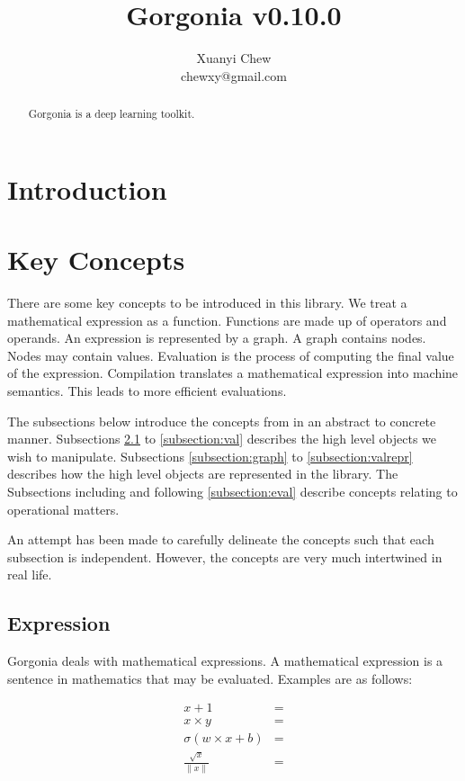 \documentclass{article}
\begin{document}
\title{Gorgonia v0.10.0}
\author{Xuanyi Chew \\
  \mbox{}
  chewxy@gmail.com
}
\maketitle

\begin{abstract}
  Gorgonia is a deep learning toolkit.
\end{abstract}

\section{Introduction}

\section{Key Concepts}

There are some key concepts to be introduced in this library. We treat a mathematical expression as a function. Functions are made up of operators and operands. An expression is represented by a graph. A graph contains nodes. Nodes may contain values. Evaluation is the process of computing the final value of the expression. Compilation translates a mathematical expression into machine semantics. This leads to more efficient evaluations.

The subsections below introduce the concepts from in an abstract to concrete manner. Subsections \ref{subsection:expr} to \ref{subsection:val} describes the high level objects we wish to manipulate. Subsections \ref{subsection:graph} to \ref{subsection:valrepr} describes how the high level objects are represented in the library. The Subsections including and following \ref{subsection:eval} describe concepts relating to operational matters.

An attempt has been made to carefully delineate the concepts such that each subsection is independent. However, the concepts are very much intertwined in real life.

\subsection{Expression} \label{subsection:expr}

Gorgonia deals with mathematical expressions. A mathematical expression is a sentence in mathematics that may be evaluated. Examples are as follows:

\begin{align*}
  x + 1 &=\\
  x \times y &= \\
  \sigma(w \times x + b) &=\\
  \frac{\sqrt x}{\|x\|} &=
\end{align*}
\end{document}
